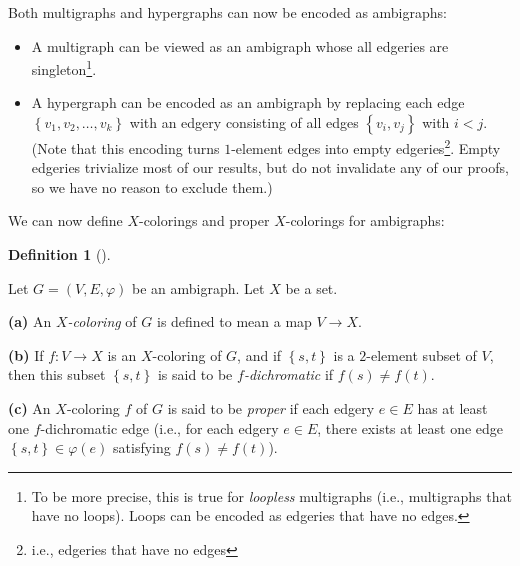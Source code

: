 \documentclass[numbers=enddot,12pt,final,onecolumn,notitlepage]{scrartcl}%
\theoremstyle{definition}
\newtheorem{defi}[theo]{Definition}
\newenvironment{definition}[1][]
{\begin{defi}[#1]\begin{leftbar}}
{\end{leftbar}\end{defi}}
\begin{document}
Both multigraphs and hypergraphs can now be encoded as ambigraphs:

\begin{itemize}
\item A multigraph can be viewed as an ambigraph whose all edgeries are
singleton\footnote{To be more precise, this is true for \emph{loopless}
multigraphs (i.e., multigraphs that have no loops). Loops can be encoded as
edgeries that have no edges.}.

\item A hypergraph can be encoded as an ambigraph by replacing each edge
$\left\{  v_{1},v_{2},\ldots,v_{k}\right\}  $ with an edgery consisting of all
edges $\left\{  v_{i},v_{j}\right\}  $ with $i<j$. (Note that this encoding
turns $1$-element edges into empty edgeries\footnote{i.e., edgeries that have
no edges}. Empty edgeries trivialize most of our results, but do not
invalidate any of our proofs, so we have no reason to exclude them.)
\end{itemize}

We can now define $X$-colorings and proper $X$-colorings for ambigraphs:

\begin{definition}
Let $G=\left(  V,E,\varphi\right)  $ be an ambigraph. Let $X$ be a set.

\textbf{(a)} An $X$\emph{-coloring} of $G$ is defined to mean a map
$V\rightarrow X$.

\textbf{(b)} If $f:V\rightarrow X$ is an $X$-coloring of $G$, and if $\left\{
s,t\right\}  $ is a $2$-element subset of $V$, then this subset $\left\{
s,t\right\}  $ is said to be $f$\emph{-dichromatic} if $f\left(  s\right)
\neq f\left(  t\right)  $.

\textbf{(c)} An $X$-coloring $f$ of $G$ is said to be \emph{proper} if each
edgery $e\in E$ has at least one $f$-dichromatic edge (i.e., for each edgery
$e\in E$, there exists at least one edge $\left\{  s,t\right\}  \in
\varphi\left(  e\right)  $ satisfying $f\left(  s\right)  \neq f\left(
t\right)  $).
\end{definition}
\end{document}
